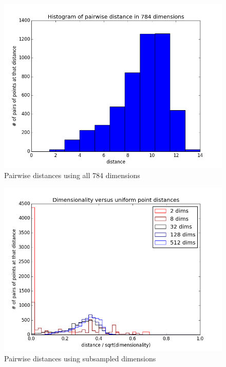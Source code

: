 \documentclass{article}
\begin{document}
	\begin{figure} [h!]
		\centering
		\includegraphics[scale = .65]{AllDims.png}
		\caption{Pairwise distances using all 784 dimensions}
		\label{alldims_fig}
	\end{figure}
		
	\begin{figure} [h!]
		\centering
		\includegraphics[scale = .65]{Subsampled.png}
		\caption{Pairwise distances using subsampled dimensions}
		\label{subsample_fig}
	\end{figure}
	
	\FloatBarrier
	
\end{document}
